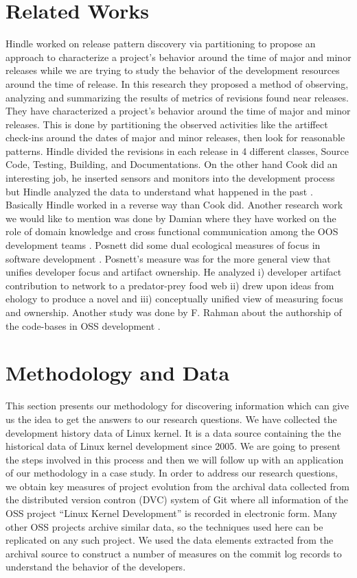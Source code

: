 \documentclass{acm_proc_article-sp}
\begin{document}
\section{Related Works}
Hindle worked on release pattern discovery via partitioning \cite{hindle_release_pattern} to propose an approach to characterize a project's behavior around the time of major and minor releases while we are trying to study the behavior of the development resources around the time of release. In this research they proposed a method of observing, analyzing and summarizing the results of metrics of revisions found near releases. They have characterized a project's behavior around the time of major and minor releases. This is done by partitioning the observed activities like the artiffect check-ins around the dates of major and minor releases, then look for reasonable patterns. Hindle divided the revisions in each release in 4 different classes, Source Code, Testing, Building, and Documentations. On the other hand Cook did an interesting job, he inserted sensors and monitors into the development process but Hindle analyzed the data to understand what happened in the past \cite{cook_automating}. Basically Hindle worked in a reverse way than Cook did. Another research work we would like to mention was done by  Damian where they have worked on the role of domain knowledge and cross functional communication among the OOS development teams \cite{damian_domain}. Posnett did some dual ecological measures of focus in software development \cite{posnett_ecological}. Posnett's measure was for the more general view that unifies developer focus and artifact ownership. He analyzed i) developer artifact contribution to network to a predator-prey food web ii) drew upon ideas from ehology to produce a novel and iii) conceptually unified view of measuring focus and ownership. Another study was done by F. Rahman about the authorship of the code-bases in OSS development \cite{rahman_ownership}.

\section{Methodology and Data}
This section presents our methodology for discovering information which can give us the idea to get the answers to our research questions. We have collected the development history data of Linux kernel. It is a data source containing the the historical data of Linux kernel development since 2005. We are going to present the steps involved in this process and then we will follow up with an application of our methodology in a case study. In order to address our research questions, we obtain key measures of project evolution from the archival data collected from the distributed version contron (DVC) system of Git where all information of the OSS project ``Linux Kernel Development'' is recorded in electronic form. Many other OSS projects archive similar data, so the techniques used here can be replicated on any such project. We used the data elements extracted from the archival source to construct a number of measures on the commit log records to understand the behavior of the developers.
\end{document}
